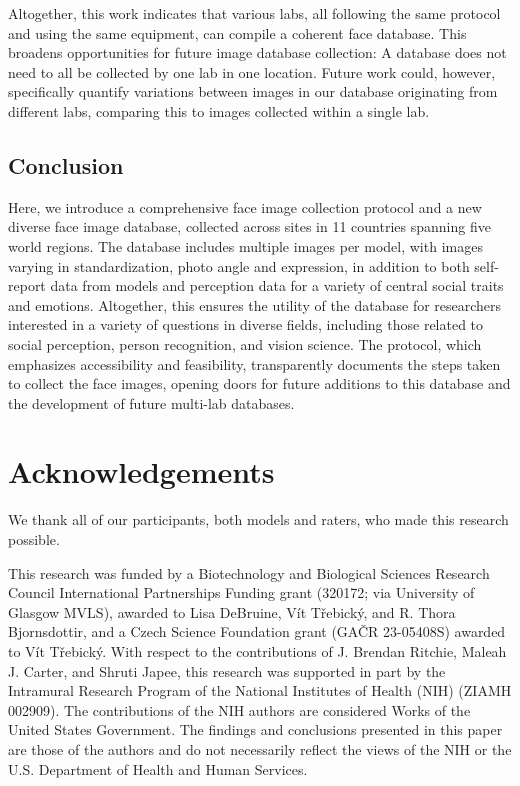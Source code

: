 \documentclass[
  letterpaper,
  DIV=11,
  numbers=noendperiod]{scrartcl}
\begin{document}
Altogether, this work indicates that various labs, all following the
same protocol and using the same equipment, can compile a coherent face
database. This broadens opportunities for future image database
collection: A database does not need to all be collected by one lab in
one location. Future work could, however, specifically quantify
variations between images in our database originating from different
labs, comparing this to images collected within a single lab.

\subsection{Conclusion}\label{conclusion}

Here, we introduce a comprehensive face image collection protocol and a
new diverse face image database, collected across sites in 11 countries
spanning five world regions. The database includes multiple images per
model, with images varying in standardization, photo angle and
expression, in addition to both self-report data from models and
perception data for a variety of central social traits and emotions.
Altogether, this ensures the utility of the database for researchers
interested in a variety of questions in diverse fields, including those
related to social perception, person recognition, and vision science.
The protocol, which emphasizes accessibility and feasibility,
transparently documents the steps taken to collect the face images,
opening doors for future additions to this database and the development
of future multi-lab databases.

\section{Acknowledgements}\label{acknowledgements}

We thank all of our participants, both models and raters, who made this
research possible.

This research was funded by a Biotechnology and Biological Sciences
Research Council International Partnerships Funding grant (320172; via
University of Glasgow MVLS), awarded to Lisa DeBruine, Vít Třebický, and
R. Thora Bjornsdottir, and a Czech Science Foundation grant (GAČR
23-05408S) awarded to Vít Třebický. With respect to the contributions of
J. Brendan Ritchie, Maleah J. Carter, and Shruti Japee, this research
was supported in part by the Intramural Research Program of the National
Institutes of Health (NIH) (ZIAMH 002909). The contributions of the NIH
authors are considered Works of the United States Government. The
findings and conclusions presented in this paper are those of the
authors and do not necessarily reflect the views of the NIH or the U.S.
Department of Health and Human Services.
\end{document}
